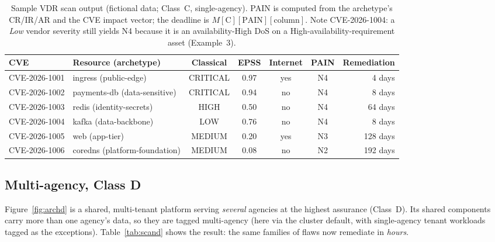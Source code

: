 \documentclass[11pt]{article}
\newcommand{\tagn}[1]{{\footnotesize\ttfamily #1}}
\begin{document}
\begin{table}[H]
\centering
\renewcommand{\arraystretch}{1.3}
\setlength{\tabcolsep}{4pt}
\footnotesize
\begin{tabular}{l l c c c c r}
\toprule
\textbf{CVE} & \textbf{Resource (archetype)} & \textbf{Classical} & \textbf{EPSS} & \textbf{Internet} & \textbf{PAIN} & \textbf{Remediation} \\
\midrule
CVE-2026-1001 & ingress \tagn{(public-edge)}        & \cellcolor{crit!25}CRITICAL & 0.97 & yes & \cellcolor{high!35}N4 & 4 days \\
CVE-2026-1002 & payments-db \tagn{(data-sensitive)} & \cellcolor{crit!25}CRITICAL & 0.94 & no  & \cellcolor{high!35}N4 & 8 days \\
CVE-2026-1003 & redis \tagn{(identity-secrets)}     & \cellcolor{high!25}HIGH     & 0.50 & no  & \cellcolor{high!35}N4 & 64 days \\
CVE-2026-1004 & kafka \tagn{(data-backbone)}        & \cellcolor{low!30}LOW       & 0.76 & no  & \cellcolor{high!35}N4 & 8 days \\
CVE-2026-1005 & web \tagn{(app-tier)}               & \cellcolor{med!35}MEDIUM    & 0.20 & yes & \cellcolor{med!35}N3 & 128 days \\
CVE-2026-1006 & coredns \tagn{(platform-foundation)}& \cellcolor{med!35}MEDIUM    & 0.08 & no  & \cellcolor{low!30}N2 & 192 days \\
\bottomrule
\end{tabular}
\caption{Sample VDR scan output (fictional data; Class~C, single-agency). PAIN is
computed from the archetype's CR/IR/AR and the CVE impact vector; the deadline is
$M[\text{C}][\text{PAIN}][\text{column}]$. Note CVE-2026-1004: a \emph{Low} vendor
severity still yields N4 because it is an availability-High DoS on a
High-availability-requirement asset (Example~3).}
\label{tab:scan}
\end{table}

\subsection{Multi-agency, Class D}
Figure~\ref{fig:archd} is a shared, multi-tenant platform serving \emph{several}
agencies at the highest assurance (Class~D). Its shared components carry more than
one agency's data, so they are tagged multi-agency (here via the cluster default,
with single-agency tenant workloads tagged as the exceptions). Table~\ref{tab:scand}
shows the result: the same families of flaws now remediate in \emph{hours}.
\end{document}

